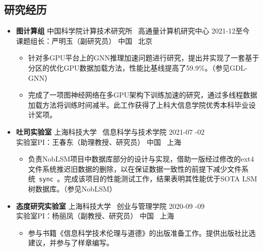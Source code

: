 \documentclass[a4paper,10pt]{ctexart} %
\begin{document}
\begin{keepsection}
\subsection{研究经历}
\begin{itemize}
    \item \textbf{图计算组} \quad 中国科学院计算技术研究所 \, 高通量计算机研究中心 \hfill 2021-12至今 \\
    {\small 课题组长：严明玉（副研究员）} \hfill 中国 \, 北京
    \begin{small}
        \begin{itemize}
            \item 针对多GPU平台上的GNN推理加速问题进行研究，提出并实现了一套基于分区的优化GPU数据加载方法，性能比基线提高了59.9\%。（参见GDL-GNN）
            \item 完成了一项图神经网络在多GPU架构下训练加速的研究，通过多线程数据加载方法将训练时间减半。此工作获得了上科大信息学院优秀本科毕业设计奖项。
        \end{itemize}
    \end{small}

    \item \textbf{吐司实验室} \quad 上海科技大学 \, 信息科学与技术学院 \hfill 2021-07 -02 \\
    {\small 实验室PI：王春东（助理教授、研究员）} \hfill 中国 \, 上海
    \begin{small}
        \begin{itemize}
            \item 负责NobLSM项目中数据库部分的设计与实现，借助一版经过修改的ext4文件系统推迟旧数据的删除，以在保证数据一致性的前提下减少文件系统~\texttt{sync}~。完成该项目的性能测试工作，结果表明其性能优于SOTA LSM树数据库。（参见NobLSM）
        \end{itemize}
    \end{small}

    \item \textbf{态度研究实验室} \quad 上海科技大学 \, 创业与管理学院 \hfill 2020-09 -09 \\
    {\small 实验室PI：杨丽凤（副教授、研究员）} \hfill 中国 \, 上海
    \begin{small}
        \begin{itemize}
            \item 参与书籍《信息科学技术伦理与道德》的出版准备工作。提供出版社比选建议，并参与了样章编写。
        \end{itemize}
    \end{small}
\end{itemize}
\end{keepsection}
\end{document}
